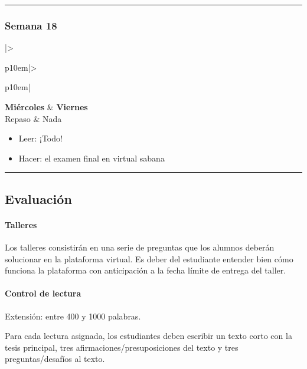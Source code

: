 \documentclass[spanish,]{article}
\let\oldparagraph\paragraph
\renewcommand{\paragraph}[1]{\oldparagraph{#1}\mbox{}}
\begin{document}
\begin{center}\rule{0.5\linewidth}{\linethickness}\end{center}

\subsubsection{Semana 18}\label{semana-18}

\begin{tabular}{|>{\raggedright\arraybackslash}p{10em}|>{\raggedright\arraybackslash}p{10em}|}
\hline
\textbf{Miércoles} & \textbf{Viernes}\\
\hline
Repaso & Nada\\
\hline
\end{tabular}

\begin{itemize}
\item
  Leer: ¡Todo!
\item
  Hacer: el examen final en virtual sabana
\end{itemize}

\begin{center}\rule{0.5\linewidth}{\linethickness}\end{center}

\subsection{Evaluación}\label{evaluacion}

\paragraph{\texorpdfstring{\textbf{Talleres}}{Talleres}}\label{talleres}

Los talleres consistirán en una serie de preguntas que los alumnos
deberán solucionar en la plataforma virtual. Es deber del estudiante
entender bien cómo funciona la plataforma con anticipación a la fecha
límite de entrega del taller.

\paragraph{\texorpdfstring{\textbf{Control de
lectura}}{Control de lectura}}\label{control-de-lectura}

Extensión: entre 400 y 1000 palabras.

Para cada lectura asignada, los estudiantes deben escribir un texto
corto con la tesis principal, tres afirmaciones/presuposiciones del
texto y tres preguntas/desafíos al texto.
\end{document}

